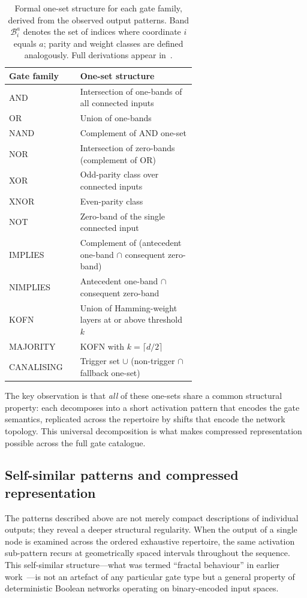 \documentclass[11pt]{article}
\begin{document}
\begin{table}[h]
\centering
\small
\begin{tabular}{@{}lp{0.62\linewidth}@{}}
\toprule
\textbf{Gate family} & \textbf{One-set structure} \\
\midrule
AND      & Intersection of one-bands of all connected inputs \\
OR       & Union of one-bands \\
NAND     & Complement of AND one-set \\
NOR      & Intersection of zero-bands (complement of OR) \\
XOR      & Odd-parity class over connected inputs \\
XNOR     & Even-parity class \\
NOT      & Zero-band of the single connected input \\
IMPLIES  & Complement of (antecedent one-band $\cap$ consequent zero-band) \\
NIMPLIES & Antecedent one-band $\cap$ consequent zero-band \\
KOFN     & Union of Hamming-weight layers at or above threshold $k$ \\
MAJORITY & KOFN with $k=\lceil d/2 \rceil$ \\
CANALISING & Trigger set $\cup$ (non-trigger $\cap$ fallback one-set) \\
\bottomrule
\end{tabular}
\caption{Formal one-set structure for each gate family, derived from the
observed output patterns.  Band $\mathcal{B}_i^a$ denotes the set of
indices where coordinate $i$ equals $a$; parity and weight classes are
defined analogously.  Full derivations appear in~\cite{formalmanuscript}.}
\label{tab:gate-families}
\end{table}

The key observation is that \emph{all} of these one-sets share a common
structural property: each decomposes into a short activation pattern that
encodes the gate semantics, replicated across the repertoire by shifts
that encode the network topology.  This universal decomposition is what
makes compressed representation possible across the full gate catalogue.

\subsection{Self-similar patterns and compressed representation}\label{sec:decomposition}

The patterns described above are not merely compact descriptions of
individual outputs; they reveal a deeper structural regularity.  When
the output of a single node is examined across the ordered exhaustive
repertoire, the same activation sub-pattern recurs at geometrically
spaced intervals throughout the sequence.  This self-similar
structure---what was termed ``fractal behaviour'' in earlier
work~\cite{hernandez2019}---is not an artefact of any particular gate
type but a general property of deterministic Boolean networks operating
on binary-encoded input spaces.
\end{document}

